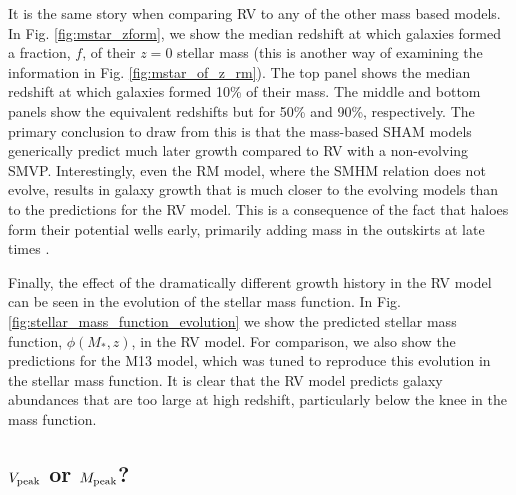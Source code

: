 \documentclass[useAMS,fleqn,usenatbib]{mnras}
\begin{document}
It is the same story when comparing RV to any of the other mass based models.  In Fig. \ref{fig:mstar_zform}, we show the median redshift
at which galaxies formed a fraction, $f$, of their $z=0$ stellar mass (this is another way of examining the information in Fig. \ref{fig:mstar_of_z_rm}).  The top panel shows the median redshift at which galaxies formed 10\% of their mass.  The middle and bottom panels show the equivalent redshifts but for 50\% and 90\%, respectively.  The primary conclusion to draw from this is that the mass-based SHAM models generically predict much later growth compared to RV with a non-evolving SMVP.  Interestingly, even the RM model, where the SMHM relation does not evolve, results in galaxy growth that is much closer to the evolving models than to the predictions for the RV model.  This is a consequence of the fact that haloes form their potential wells early, primarily adding mass in the outskirts at late times \citep{Bosch:2014cu}.

Finally, the effect of the dramatically different growth history in the RV model can be seen in the evolution of the stellar mass function.  In Fig. \ref{fig:stellar_mass_function_evolution} we show the predicted stellar mass function, $\phi(M_*,z)$, in the RV model. For comparison, we also show the predictions for the M13 model, which was tuned to reproduce this evolution in the stellar mass function. It is clear that the RV model predicts galaxy abundances that are too large at high redshift, particularly below the knee in the mass function.


\subsection{$V_{\rm peak}$ or $M_{\rm peak}$?}
\label{sec:vpeak_or_mpeak}
\end{document}
